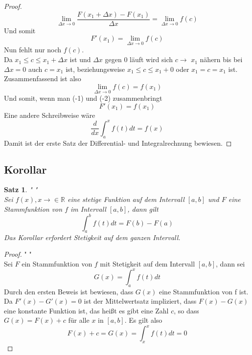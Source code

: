 \documentclass[fontsize=12pt,paper=a4,DIV12,cleardoublepage=empty, 
liststotoc,idxtotoc,bibtotoc]{article}
\newcommand{\RR}{\mathbb{R}}
\theoremstyle{plain}
\newtheorem{satz}{Satz}[subsection]
\theoremstyle{definition}
\begin{document}
\begin{proof}
\begin{equation}
			\lim \limits_{\Delta x \to 0} \frac{F(x_1+\Delta x)-F(x_1)}{\Delta x}=\lim \limits_{\Delta x \to 0}f(c)
		\end{equation}
		Und somit
		\begin{equation}
			F'(x_1)=\lim \limits_{\Delta x \to 0}f(c)
		\end{equation}
		Nun fehlt nur noch $f(c)$.\\ Da $x_1 \leq c \leq x_1+\Delta x$ ist und $\Delta x$ gegen $0$ läuft wird sich $c\to$ $x_1$ nähern bis bei $\Delta x=0$ auch $c = x_1$ ist, beziehungsweise $x_1 \leq c \leq x_1 + 0$ oder $x_1 = c = x_1$ ist.\\Zusammenfassend ist also
		\begin{equation}
			\lim \limits_{\Delta x \to 0} f(c) = f(x_1)
		\end{equation}
		Und somit, wenn man (-1) und (-2) zusammenbringt
		\begin{equation}
			F'(x_1)=f(x_1)
		\end{equation}
		Eine andere Schreibweise wäre
		\begin{equation}
			\frac{d}{dx}\int_{a}^{x}f(t)dt=f(x)
		\end{equation}
		Damit ist der erste Satz der Differential- und Integralrechnung bewiesen.
	\end{proof}
	
	\subsection{Korollar}
	\begin{satz}" "\\
		Sei $f(x), x \to \in \RR$ eine stetige Funktion auf dem Intervall $[a, b]$ und $F$ eine Stammfunktion von $f$ im Intervall $[a, b]$, dann gilt
		\begin{equation}
			\int_{a}^{b}f(t)dt=F(b)-F(a)
		\end{equation}
		Das Korollar erfordert Stetigkeit auf dem ganzen Intervall.
	\end{satz}

	\begin{proof}" "\\
		Sei $F$ ein Stammfunktion von $f$ mit Stetigkeit auf dem Intervall $[a, b]$, dann sei
		\begin{equation}
			G(x)=\int_{a}^{x}f(t)dt
		\end{equation}
		Durch den ersten Beweis ist bewiesen, dass $G(x)$ eine Stammfunktion von f ist. Da $F'(x)-G'(x)=0$ ist der Mittelwertsatz impliziert, dass $F(x)-G(x)$ eine konstante Funktion ist, das heißt es gibt eine Zahl $c$, so dass $G(x)=F(x)+c$ für alle $x$ in $[a, b]$. Es gilt also
		\begin{equation}
			F(x)+c=G(x)=\int_{x}^{x}f(t)dt=0
		\end{equation}
	\end{proof}
		
\end{document}
